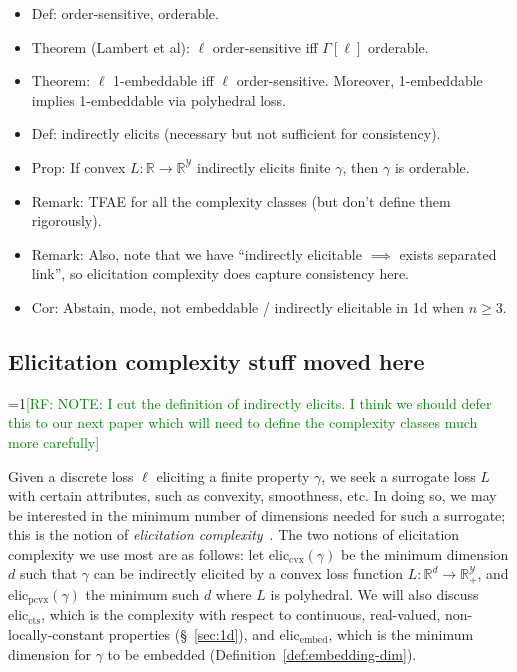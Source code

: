 \documentclass[12pt]{article}
\newcommand{\Comments}{1}
\newcommand{\mynote}[2]{\ifnum\Comments=1\textcolor{#1}{#2}\fi}
\newcommand{\raf}[1]{\mynote{green}{[RF: #1]}}
\newcommand{\reals}{\mathbb{R}}
\newcommand{\prop}[1]{\Gamma[#1]}
\newcommand{\eliccts}{\mathrm{elic}_\mathrm{cts}}
\newcommand{\eliccvx}{\mathrm{elic}_\mathrm{cvx}}
\newcommand{\elicpoly}{\mathrm{elic}_\mathrm{pcvx}}
\newcommand{\elicembed}{\mathrm{elic}_\mathrm{embed}}
\newcommand{\Y}{\mathcal{Y}}
\newtheorem{definition}{Definition}
\begin{document}
\begin{itemize}
\item Def: order-sensitive, orderable.
\item Theorem (Lambert et al): $\ell$ order-sensitive iff $\prop{\ell}$ orderable.
\item Theorem: $\ell$ 1-embeddable iff $\ell$ order-sensitive.  Moreover,   1-embeddable implies 1-embeddable via polyhedral loss.
  
\item Def: indirectly elicits (necessary but not sufficient for consistency).
\item Prop: If convex $L:\reals\to\reals^\Y$ indirectly elicits finite $\gamma$, then $\gamma$ is orderable.
\item Remark: TFAE for all the complexity classes (but don't define them rigorously).
\item Remark: Also, note that we have ``indirectly elicitable $\implies$ exists separated link'', so elicitation complexity does capture consistency here.
\item Cor: Abstain, mode, not embeddable / indirectly elicitable in 1d when $n\geq 3$.
\end{itemize}


\subsection*{Elicitation complexity stuff moved here}

\raf{NOTE: I cut the definition of indirectly elicits.  I think we should defer this to our next paper which will need to define the complexity classes much more carefully}




Given a discrete loss $\ell$ eliciting a finite property $\gamma$, we seek a surrogate loss $L$ with certain attributes, such as convexity, smoothness, etc.
In doing so, we may be interested in the minimum number of dimensions needed for such a surrogate; this is the notion of \emph{elicitation complexity}~\citep{lambert2008eliciting,fissler2016higher,frongillo2015elicitation}.
The two notions of elicitation complexity we use most are as follows: let $\eliccvx(\gamma)$ be the minimum dimension $d$ such that $\gamma$ can be indirectly elicited by a convex loss function $L: \reals^d \to \reals^\Y_+$, and $\elicpoly(\gamma)$ the minimum such $d$ where $L$ is polyhedral.
We will also discuss $\eliccts$, which is the complexity with respect to continuous, real-valued, non-locally-constant properties (\S~\ref{sec:1d}), and $\elicembed$, which is the minimum dimension for $\gamma$ to be embedded (Definition~\ref{def:embedding-dim}).
\end{document}
